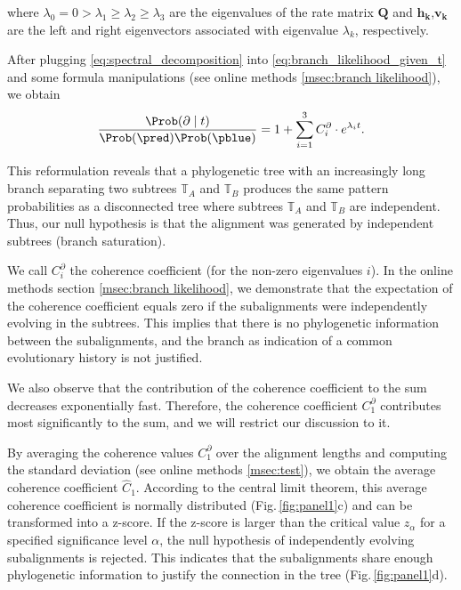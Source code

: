 where  ${\lambda_0 = 0 > \lambda_1 \geq \lambda_2 \geq \lambda_3}$  are the eigenvalues of the rate matrix $\bm{Q}$ and $\bm{h_k}$,$\bm{v_k}$  are the left and right eigenvectors associated with eigenvalue $\lambda_k$, respectively. 

After plugging \eqref{eq:spectral_decomposition} into \eqref{eq:branch_likelihood_given_t} and some formula manipulations (see online methods \ref{msec:branch likelihood}), we obtain
\begin{equation} \label{eq:branch_likelihood_at_site_t} \frac{\Prob(\partial \mid t)}{\Prob(\pred)\Prob(\pblue)} =  1 + \sum_{i =1}^3 C^\partial_i\cdot e^{\lambda_i t}.
\end{equation}


This reformulation reveals that a phylogenetic tree with an increasingly long branch separating two subtrees $\mathbb{T}_A$ and $\mathbb{T}_B$   produces the same pattern probabilities as a disconnected tree where subtrees $\mathbb{T}_A$ and $\mathbb{T}_B$ are independent. Thus, our null hypothesis is that the alignment was generated by independent subtrees (branch saturation). 

\medskip
We call $C^\partial_i$ the coherence coefficient (for the non-zero eigenvalues $i$). In the online methods section \ref{msec:branch likelihood}, we demonstrate that the expectation of the coherence coefficient equals zero if the subalignments were independently evolving in the subtrees. This implies that there is no phylogenetic information between the subalignments, and  the branch as indication of a common evolutionary history is not justified.

We also observe that the contribution of the coherence coefficient to the sum decreases exponentially fast. Therefore, the coherence coefficient $C^\partial_1$ contributes most significantly to the sum, and we will restrict our discussion to it.

\medskip 
By averaging the coherence values $C^\partial_1$  over the alignment lengths and computing the standard deviation (see online methods \ref{msec:test}), we obtain the average coherence coefficient $\hat{C}_1$. According to the central limit theorem, this average coherence coefficient is normally distributed (Fig.\,\ref{fig:panel1}c) and can be transformed into a z-score. If the z-score is larger than the critical value $z_\alpha$ for a specified significance level $\alpha$, the null hypothesis of independently evolving subalignments is rejected. This indicates that the subalignments share enough phylogenetic information to justify the connection in the tree (Fig.\,\ref{fig:panel1}d).


